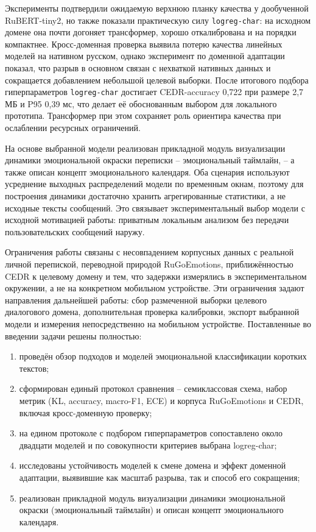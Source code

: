 \documentclass[12pt,a4paper]{report}
\begin{document}
Эксперименты подтвердили ожидаемую верхнюю планку качества у дообученной RuBERT-tiny2, но также показали практическую силу \texttt{logreg-char}: на исходном домене она почти догоняет трансформер, хорошо откалибрована и на порядки компактнее. Кросс-доменная проверка выявила потерю качества линейных моделей на нативном русском, однако эксперимент по доменной адаптации показал, что разрыв в основном связан с нехваткой нативных данных и сокращается добавлением небольшой целевой выборки. После итогового подбора гиперпараметров \texttt{logreg-char} достигает CEDR-accuracy 0{,}722 при размере 2{,}7 МБ и P95 0{,}39 мс, что делает её обоснованным выбором для локального прототипа. Трансформер при этом сохраняет роль ориентира качества при ослаблении ресурсных ограничений.

На основе выбранной модели реализован прикладной модуль визуализации динамики эмоциональной окраски переписки -- эмоциональный таймлайн, -- а также описан концепт эмоционального календаря. Оба сценария используют усреднение выходных распределений модели по временным окнам, поэтому для построения динамики достаточно хранить агрегированные статистики, а не исходные тексты сообщений. Это связывает экспериментальный выбор модели с исходной мотивацией работы: приватным локальным анализом без передачи пользовательских сообщений наружу.

Ограничения работы связаны с несовпадением корпусных данных с реальной личной перепиской, переводной природой RuGoEmotions, приближённостью CEDR к целевому домену и тем, что задержки измерялись в экспериментальном окружении, а не на конкретном мобильном устройстве. Эти ограничения задают направления дальнейшей работы: сбор размеченной выборки целевого диалогового домена, дополнительная проверка калибровки, экспорт выбранной модели и измерения непосредственно на мобильном устройстве. Поставленные во введении задачи решены полностью:
\begin{enumerate}
  \item проведён обзор подходов и моделей эмоциональной классификации коротких текстов;
  \item сформирован единый протокол сравнения -- семиклассовая схема, набор метрик (KL, accuracy, macro-F1, ECE) и корпуса RuGoEmotions и CEDR, включая кросс-доменную проверку;
  \item на едином протоколе с подбором гиперпараметров сопоставлено около двадцати моделей и по совокупности критериев выбрана logreg-char;
  \item исследованы устойчивость моделей к смене домена и эффект доменной адаптации, выявившие как масштаб разрыва, так и способ его сокращения;
  \item реализован прикладной модуль визуализации динамики эмоциональной окраски (эмоциональный таймлайн) и описан концепт эмоционального календаря.
\end{enumerate}
\end{document}
